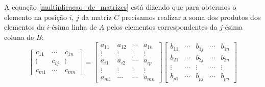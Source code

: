\documentclass{beamer}
\begin{document}
  \begin{frame}
    A equação \eqref{multiplicacao_de_matrizes} está dizendo que para obtermos o elemento na posição $i$, $j$ da matriz $C$ precisamos 
    realizar a soma dos produtos dos elementos da $i$-ésima linha de $A$ pelos elementos correspondentes da $j$-ésima coluna de $B$:
    \[ 
      \begin{bmatrix}
        c_{11} & \cdots & c_{1n}\\
        \vdots & c_{ij} & \vdots\\
        c_{m1} & \cdots & c_{mn}
      \end{bmatrix} = \begin{bmatrix}
        a_{11} & a_{12} & \cdots & a_{1n}\\
        \vdots & \vdots & \vdots & \vdots\\
        a_{i1} & a_{i2} & \cdots & a_{ip}\\
        \vdots & \vdots & \vdots & \vdots\\
        a_{m1} & \cdots & \cdots & a_{mn}
      \end{bmatrix} \begin{bmatrix}
        b_{11} & \cdots & b_{1j} & \cdots & b_{1n}\\
        b_{21} & \cdots & b_{2j} & \cdots & b_{2n}\\
        \vdots & \cdots & \vdots & \cdots & \vdots\\
        b_{p1} & \cdots & b_{pj} & \cdots & b_{pn}
      \end{bmatrix} 
    \]
  \end{frame}
\end{document}
